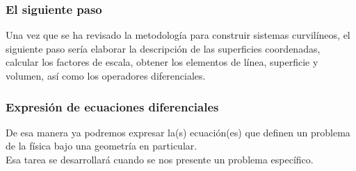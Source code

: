 \documentclass[12pt]{beamer}
\begin{document}
\begin{frame}
\frametitle{El siguiente paso}
Una vez que se ha revisado la metodología para construir sistemas curvilíneos, el siguiente paso sería elaborar la descripción de las superficies coordenadas, calcular los factores de escala, obtener los elementos de línea, superficie y volumen, así como los operadores diferenciales.
\end{frame}
\begin{frame}
\frametitle{Expresión de ecuaciones diferenciales}
De esa manera ya podremos expresar la(s) ecuación(es) que definen un problema de la física bajo una geometría en particular.
\\
\bigskip
\pause
Esa tarea se desarrollará cuando se nos presente un problema específico.
\end{frame}


\end{document}
